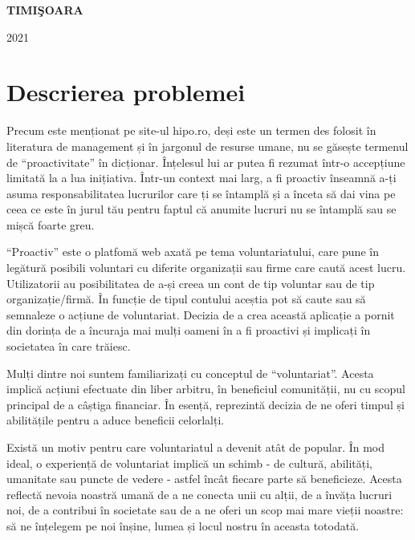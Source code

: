 \documentclass[12pt,a4paper]{report}
\begin{document}
\vfill
\begin{center}
{\bf TIMI\c SOARA

2021}
\end{center}
\newpage
\normalsize{}

\tableofcontents
\newpage

\chapter{Descrierea problemei}
\par
Precum este menționat pe site-ul hipo.ro\cite{proactiv}, deși este un termen des folosit în literatura de management și în jargonul de resurse umane, nu se găsește termenul de “proactivitate” în dicționar. Înțelesul lui ar putea fi rezumat într-o accepțiune limitată la a lua inițiativa. Într-un context mai larg, a fi proactiv înseamnă a-ți asuma responsabilitatea lucrurilor care ți se întamplă și a înceta să dai vina pe ceea ce este în jurul tău pentru faptul că anumite lucruri nu se întamplă sau se mișcă foarte greu. 
\\ \par
“Proactiv” este o platfomă web axată pe tema voluntariatului, care pune în legătură posibili voluntari cu diferite organizații sau firme care caută acest lucru. Utilizatorii au posibilitatea de a-și creea un cont de tip voluntar sau de tip organizație/firmă. În funcție de tipul contului aceștia pot să caute sau să semnaleze o acțiune de voluntariat. Decizia de a crea această aplicație a pornit din dorința de a încuraja mai mulți oameni în a fi proactivi și implicați în societatea în care trăiesc. 
\\ \par
Mulți dintre noi suntem familiarizați cu conceptul de “voluntariat”. Acesta implică acțiuni efectuate din liber arbitru, în beneficiul comunității, nu cu scopul principal de a câștiga financiar. În esență, reprezintă decizia de ne oferi timpul și abilitățile pentru a aduce beneficii celorlalți.
\\ \par
Există un motiv pentru care voluntariatul a devenit atât de popular. În mod ideal, o experiență de voluntariat implică un schimb - de cultură, abilități, umanitate sau puncte de vedere - astfel încât fiecare parte să beneficieze. Acesta reflectă nevoia noastră umană de a ne conecta unii cu alții, de a învăța lucruri noi, de a contribui în societate sau de a ne oferi un scop mai mare vieții noastre: să ne înțelegem pe noi înșine, lumea și locul nostru în aceasta totodată.
\end{document}
